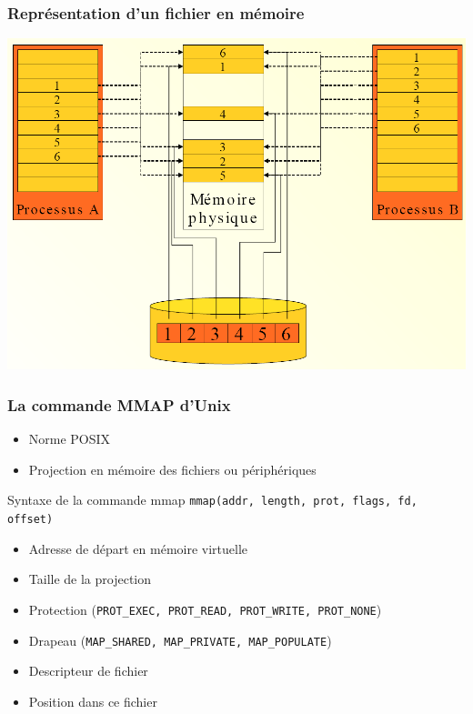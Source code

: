 \begin{frame}
\frametitle{Représentation d'un fichier en mémoire}
\includegraphics[width=.8\textwidth]{../illustration/repres_fichier_memoire.png}
\end{frame}

\begin{frame}
\frametitle{La commande MMAP d'Unix}
\begin{itemize}
  \item Norme POSIX
  \item Projection en mémoire des fichiers ou périphériques
\end{itemize}

\begin{exampleblock}{Syntaxe de la commande mmap}
    \texttt{mmap(addr, length, prot, flags, fd, offset)}
    \begin{itemize}
      \item Adresse de départ en mémoire virtuelle
      \item Taille de la projection
      \item Protection (\texttt{PROT\_EXEC, PROT\_READ, PROT\_WRITE, PROT\_NONE})
      \item Drapeau (\texttt{MAP\_SHARED, MAP\_PRIVATE, MAP\_POPULATE})
      \item Descripteur de fichier
      \item Position dans ce fichier
   \end{itemize}
\end{exampleblock}
\end{frame}


